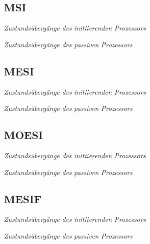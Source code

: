 \documentclass
[
	8pt,		%
	ngerman,	%
	a4paper,	%
	landscape,	%
	final		%
]{extarticle}
\begin{document}
\begin{multicols*}{4}
\subsection{MSI}
\begin{center}
	
	{\small\textit{Zustandsübergänge des initiierenden Prozessors}}
	
	{\small\textit{Zustandsübergänge des passiven Prozessors}}
\end{center}
\subsection{MESI}
\begin{center}
	
	{\small\textit{Zustandsübergänge des initiierenden Prozessors}}
	
	{\small\textit{Zustandsübergänge des passiven Prozessors}}
\end{center}
\subsection{MOESI}
\begin{center}
	
	{\small\textit{Zustandsübergänge des initiierenden Prozessors}}
	
	{\small\textit{Zustandsübergänge des passiven Prozessors}}
\end{center}
\subsection{MESIF}
\begin{center}
	
	{\small\textit{Zustandsübergänge des initiierenden Prozessors}}
	
	{\small\textit{Zustandsübergänge des passiven Prozessors}}
\end{center}
\columnbreak

\end{multicols*}
\end{document}
